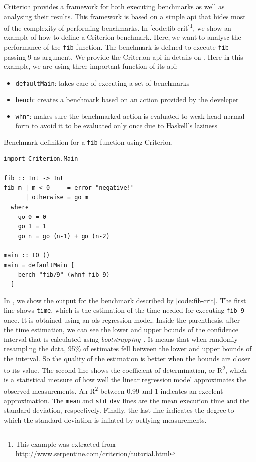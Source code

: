 Criterion provides a framework for both executing benchmarks as well as analysing their results. This framework is based on a simple \ac{api} that hides most of the complexity of performing benchmarks. In \autoref{code:fib-crit}\footnote{This example was extracted from \url{http://www.serpentine.com/criterion/tutorial.html}}, we show an example of how to define a Criterion benchmark. Here, we want to analyse the performance of the \texttt{fib} function. The benchmark is defined to execute \texttt{fib} passing 9 as argument. We provide the Criterion \ac{api} in details on . Here in this example, we are using three important function of its \ac{api}:
\begin{itemize}
  \item \texttt{defaultMain}: takes care of executing a set of benchmarks
  \item \texttt{bench}: creates a benchmark based on an action provided by the developer
  \item \texttt{whnf}: makes sure the benchmarked action is evaluated to weak head normal form to avoid it to be evaluated only once due to Haskell's laziness
\end{itemize}

\begin{listing}
  \caption{Benchmark definition for a \texttt{fib} function using Criterion}
  \begin{verbatim}
import Criterion.Main

fib :: Int -> Int
fib m | m < 0     = error "negative!"
      | otherwise = go m
  where
    go 0 = 0
    go 1 = 1
    go n = go (n-1) + go (n-2)

main :: IO ()
main = defaultMain [
    bench "fib/9" (whnf fib 9)
  ]
  \end{verbatim}
  \label{code:fib-crit}
\end{listing}

In , we show the output for the benchmark described by \autoref{code:fib-crit}. The first line shows \texttt{time}, which is the estimation of the time needed for executing \texttt{fib 9} once. It is obtained using an \ac{ols} regression model. Inside the parenthesis, after the time estimation, we can see the lower and upper bounds of the confidence interval that is calculated using \emph{bootstrapping}~\citep{davison:1997}. It means that when randomly resampling the data, 95\% of estimates fell between the lower and upper bounds of the interval. So the quality of the estimation is better when the bounds are closer to its value. The second line shows the coefficient of determination, or R\textsuperscript{2}, which is a statistical measure of how well the linear regression model approximates the observed measurements. An R\textsuperscript{2} between 0.99 and 1 indicates an excelent approximation. The \texttt{mean} and \texttt{std dev} lines are the mean execution time and the standard deviation, respectively. Finally, the last line indicates the degree to which the standard deviation is inflated by outlying measurements.

